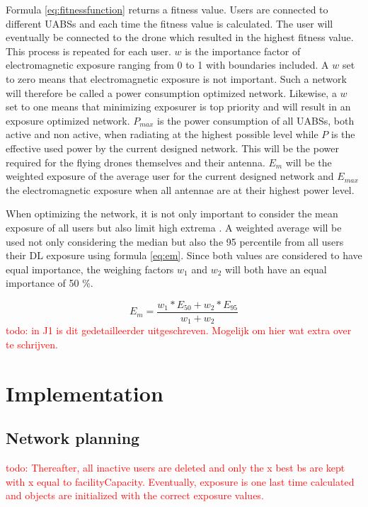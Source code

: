 Formula \ref{eq:fitnessfunction} returns a fitness value. Users are connected to different \gls{UABS}s and each time the fitness value is 
calculated. The user will eventually be connected to the drone which resulted in the highest fitness value. This process is repeated for each user.
$w$ is the importance factor of electromagnetic exposure ranging from 0 to 1 with boundaries included. A $w$ set to zero means that electromagnetic 
exposure is not important. Such a network will therefore be called a power consumption optimized network. 
Likewise, a $w$ set to one means that minimizing exposurer is top priority and will result in an exposure optimized 
network. $P_{max}$ is the power consumption of all \gls{UABS}s, both active and non active, when radiating at the highest possible level 
while $P$ is the effective used power by the current designed network. 
This will be the power required for the flying drones themselves and their antenna.
$E_m$ will be the weighted exposure of the average user for the current designed network and $E_{max}$ the electromagnetic exposure when all antennae are at their highest power level.

When optimizing the network, it is not only important to consider the mean exposure of all users but also limit high extrema  \cite{J1}. A weighted average 
will be  used not only considering the median but also the  95 percentile from all users their \gls{DL} exposure using formula \ref{eq:em}. 
Since both values are considered to have equal importance, the weighing factors $w_1$ and $w_2$ will both have an equal importance of 50 \%. 

\begin{equation} 
E_m = \frac{w_1 * E_{50} + w_2 * E_{95}}{w_1 + w_2}
\label{eq:em}
\end{equation}
\textcolor{red}{todo: in J1 is dit gedetailleerder uitgeschreven. Mogelijk om hier wat extra over te schrijven.}


\section{Implementation}

\subsection{Network planning}
\textcolor{red}{todo: Thereafter, all inactive users are deleted and only the x best bs are kept with x equal to facilityCapacity. Eventually, exposure is one last time calculated and objects are initialized with the correct exposure values.}

